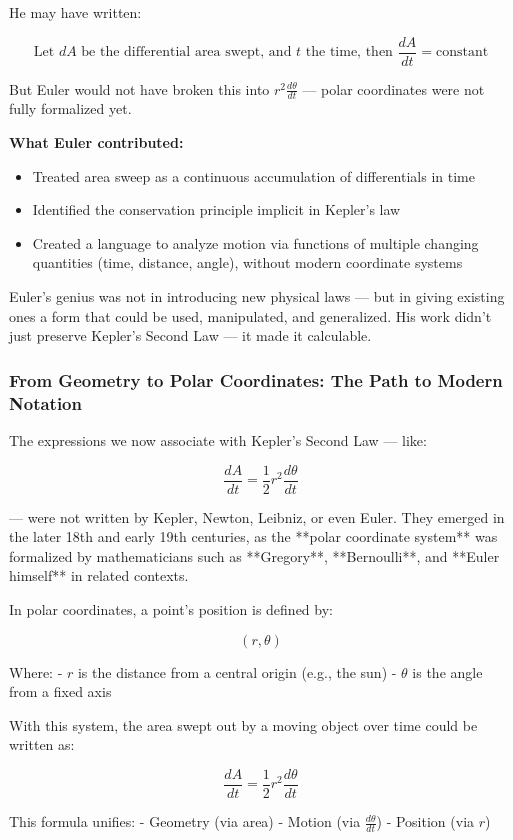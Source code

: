 He may have written:

\[
\text{Let } dA \text{ be the differential area swept, and } t \text{ the time, then } \frac{dA}{dt} = \text{constant}
\]

But Euler would not have broken this into \( r^2 \frac{d\theta}{dt} \) — polar coordinates were not fully formalized yet.

\textbf{What Euler contributed:}
\begin{itemize}
    \item Treated area sweep as a continuous accumulation of differentials in time
    \item Identified the conservation principle implicit in Kepler’s law
    \item Created a language to analyze motion via functions of multiple changing quantities (time, distance, angle), without modern coordinate systems
\end{itemize}

Euler's genius was not in introducing new physical laws — but in giving existing ones a form that could be used, manipulated, and generalized. His work didn’t just preserve Kepler’s Second Law — it made it calculable.

\subsubsection*{From Geometry to Polar Coordinates: The Path to Modern Notation}

The expressions we now associate with Kepler’s Second Law — like:

\[
\frac{dA}{dt} = \frac{1}{2} r^2 \frac{d\theta}{dt}
\]

— were not written by Kepler, Newton, Leibniz, or even Euler. They emerged in the later 18th and early 19th centuries, as the **polar coordinate system** was formalized by mathematicians such as **Gregory**, **Bernoulli**, and **Euler himself** in related contexts.

In polar coordinates, a point’s position is defined by:

\[
(r, \theta)
\]

Where:
- \( r \) is the distance from a central origin (e.g., the sun)
- \( \theta \) is the angle from a fixed axis

With this system, the area swept out by a moving object over time could be written as:

\[
\frac{dA}{dt} = \frac{1}{2} r^2 \frac{d\theta}{dt}
\]

This formula unifies:
- Geometry (via area)
- Motion (via \( \frac{d\theta}{dt} \))
- Position (via \( r \))

